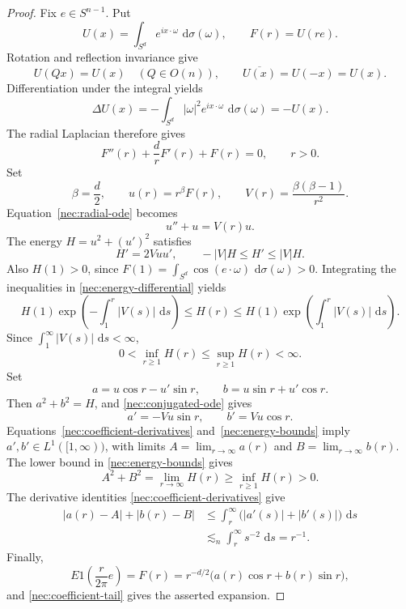\documentclass[11pt]{article}
\numberwithin{equation}{section}
\newcommand{\dd}{\,\mathrm{d}}
\begin{document}
\begin{proof}
Fix \(e\in S^{n-1}\). Put
\[
  U(x)=\int_{S^d}e^{ix\cdot\omega}\,\dd\sigma(\omega),
  \qquad F(r)=U(re).
\]
Rotation and reflection invariance give
\[
 U(Qx)=U(x)\quad(Q\in O(n)),\qquad \overline{U(x)}=U(-x)=U(x).
\]
Differentiation under the integral yields
\[
 \Delta U(x)
 =-\int_{S^d}|\omega|^2e^{ix\cdot\omega}\,\dd\sigma(\omega)
 =-U(x).
\]
The radial Laplacian therefore gives
\begin{equation}\label{nec:radial-ode}
  F''(r)+\frac{d}{r}F'(r)+F(r)=0,\qquad r>0 .
\end{equation}
Set
\[
 \beta=\frac d2,\qquad u(r)=r^\beta F(r),\qquad
 V(r)=\frac{\beta(\beta-1)}{r^2}.
\]
Equation~\eqref{nec:radial-ode} becomes
\begin{equation}\label{nec:conjugated-ode}
 u''+u=V(r)u.
\end{equation}
The energy \(H=u^2+(u')^2\) satisfies
\begin{equation}\label{nec:energy-differential}
  H'=2Vuu',\qquad -|V|H\le H'\le |V|H .
\end{equation}
Also \(H(1)>0\), since
\(F(1)=\int_{S^d}\cos(e\cdot\omega)\,\dd\sigma(\omega)>0\).
Integrating the inequalities in \eqref{nec:energy-differential} yields
\[
  H(1)\exp\left(-\int_1^r |V(s)|\,\dd s\right)
  \le H(r)
  \le H(1)\exp\left(\int_1^r |V(s)|\,\dd s\right).
\]
Since \(\int_1^\infty |V(s)|\,\dd s<\infty\),
\begin{equation}\label{nec:energy-bounds}
 0<\inf_{r\ge1}H(r)\le \sup_{r\ge1}H(r)<\infty.
\end{equation}
Set
\[
  a=u\cos r-u'\sin r,
  \qquad b=u\sin r+u'\cos r .
\]
Then \(a^2+b^2=H\), and \eqref{nec:conjugated-ode} gives
\begin{equation}\label{nec:coefficient-derivatives}
  a'=-Vu\sin r,\qquad b'=Vu\cos r .
\end{equation}
Equations~\eqref{nec:coefficient-derivatives} and~\eqref{nec:energy-bounds} imply \(a',b'\in L^1([1,\infty))\), with limits
\(A=\lim_{r\to\infty}a(r)\) and \(B=\lim_{r\to\infty}b(r)\). The lower bound in \eqref{nec:energy-bounds} gives
\[
 A^2+B^2=\lim_{r\to\infty}H(r)\ge\inf_{r\ge1}H(r)>0.
\]
The derivative identities \eqref{nec:coefficient-derivatives} give
\begin{equation}\label{nec:coefficient-tail}
 \begin{aligned}
 |a(r)-A|+|b(r)-B|
 &\le\int_r^\infty\bigl(|a'(s)|+|b'(s)|\bigr)\,\dd s\\
 &\lesssim_n\int_r^\infty s^{-2}\,\dd s=r^{-1}.
 \end{aligned}
\end{equation}
Finally,
\[
 E1\left(\frac r{2\pi}e\right)
 =F(r)=r^{-d/2}\bigl(a(r)\cos r+b(r)\sin r\bigr),
\]
and \eqref{nec:coefficient-tail} gives the asserted expansion.
\end{proof}
\end{document}
